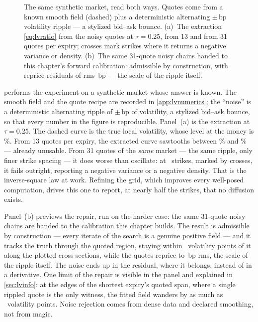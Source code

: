 \begin{figure}[htbp]
\centering
{}
\caption{The same synthetic market, read both ways.  Quotes come from
a known smooth field (dashed) plus a deterministic alternating
$\pm$\MacLvWrongRippleBp\,bp volatility ripple --- a stylized
bid--ask bounce.  (a)~The extraction \eqref{eq:lvratio} from the noisy
quotes at $\tau=0.25$, from 13 and from 31 quotes per expiry; crosses
mark strikes where it returns a negative variance or density.
(b)~The same 31-quote noisy chains handed to this chapter's forward
calibration: admissible by construction, with reprice residuals of
rms \MacLvWrongQuoteRmsBp\,bp --- the scale of the ripple itself.}
\label{fig:lvwrongway}
\end{figure}

 performs the experiment on a synthetic market
whose answer is known.  The smooth field and the quote recipe are
recorded in \cref{app:lvnumerics}; the ``noise'' is a deterministic
alternating ripple of $\pm$\MacLvWrongRippleBp\,bp of volatility, a
stylized bid--ask bounce, so that every number in the figure is
reproducible.  Panel~(a) is the extraction at $\tau=0.25$.  The dashed
curve is the true local volatility, whose level at the money is
\MacLvWrongTruthAtmPct\%.  From 13 quotes per expiry, the extracted
curve sawtooths between \MacLvWrongCoarseMinPct\% and
\MacLvWrongMaxSpikePct\% --- already unusable.  From 31 quotes of the
\emph{same} market --- the same ripple, only finer strike spacing ---
it does worse than oscillate: at \MacLvWrongNBad\ strikes, marked by
crosses, it fails outright, reporting a negative variance or a
negative density.  That is the inverse-square law at work.  Refining
the grid, which improves every well-posed computation, drives this one
to report, at nearly half the strikes, that no diffusion exists.

Panel~(b) previews the repair, run on the harder case: the same
31-quote noisy chains are handed to the calibration this chapter
builds.  The result is admissible by construction --- every iterate of
the search is a genuine positive field --- and it tracks the truth
through the quoted region, staying within \MacLvWrongFwdMaxPts\
volatility points of it along the plotted cross-sections, while the
quotes reprice to \MacLvWrongQuoteRmsBp\,bp rms, the scale of the
ripple itself.  The noise ends up in the residual, where it belongs,
instead of in a derivative.  One limit of the repair is visible in the
panel and explained in \cref{sec:lvinfo}: at the edges of the
shortest expiry's quoted span, where a single rippled quote is the
only witness, the fitted field wanders by as much as
\MacLvWrongEdgePts\ volatility points.  Noise rejection comes from
dense data and declared smoothing, not from magic.

